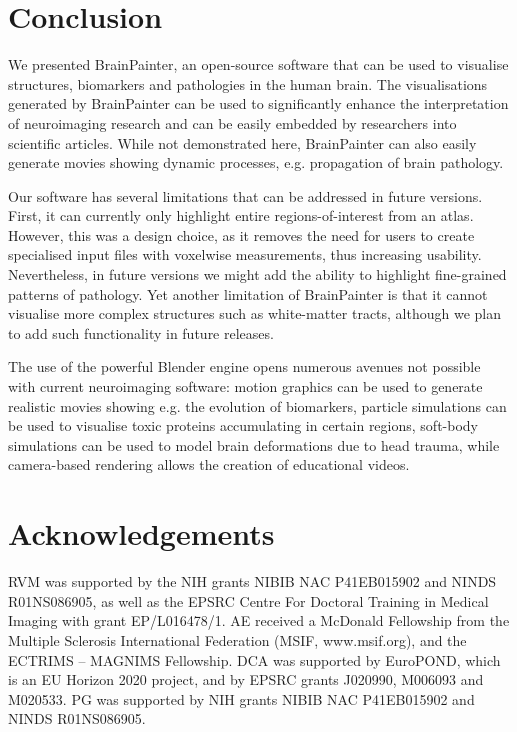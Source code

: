 \documentclass{llncs}
\begin{document}
\section{Conclusion}

We presented BrainPainter, an open-source software that can be used to visualise structures, biomarkers and pathologies in the human brain. The visualisations generated by BrainPainter can be used to significantly enhance the interpretation of neuroimaging research and can be easily embedded by researchers into scientific articles. While not demonstrated here, BrainPainter can also easily generate movies showing dynamic processes, e.g. propagation of brain pathology. 

Our software has several limitations that can be addressed in future versions. First, it can currently only highlight entire regions-of-interest from an atlas. However, this was a design choice, as it removes the need for users to create specialised input files with voxelwise measurements, thus increasing usability. Nevertheless, in future versions we might add the ability to highlight fine-grained patterns of pathology. Yet another limitation of BrainPainter is that it cannot visualise more complex structures such as white-matter tracts, although we plan to add such functionality in future releases. 

The use of the powerful Blender engine opens numerous avenues not possible with current neuroimaging software: motion graphics can be used to generate realistic movies showing e.g. the evolution of biomarkers, particle simulations can be used to visualise toxic proteins accumulating in certain regions, soft-body simulations can be used to model brain deformations due to head trauma, while camera-based rendering allows the creation of educational videos. 

\FloatBarrier
\section{Acknowledgements}


RVM was supported by the NIH grants NIBIB NAC P41EB015902 and NINDS R01NS086905, as well as the EPSRC Centre For Doctoral Training in Medical Imaging with grant EP/L016478/1. AE received a McDonald Fellowship from the Multiple Sclerosis International Federation (MSIF, www.msif.org), and the ECTRIMS -- MAGNIMS Fellowship. DCA was supported by EuroPOND, which is an EU Horizon 2020 project, and by EPSRC grants J020990, M006093 and M020533. PG was supported by NIH grants NIBIB NAC P41EB015902 and NINDS R01NS086905. 
\end{document}
